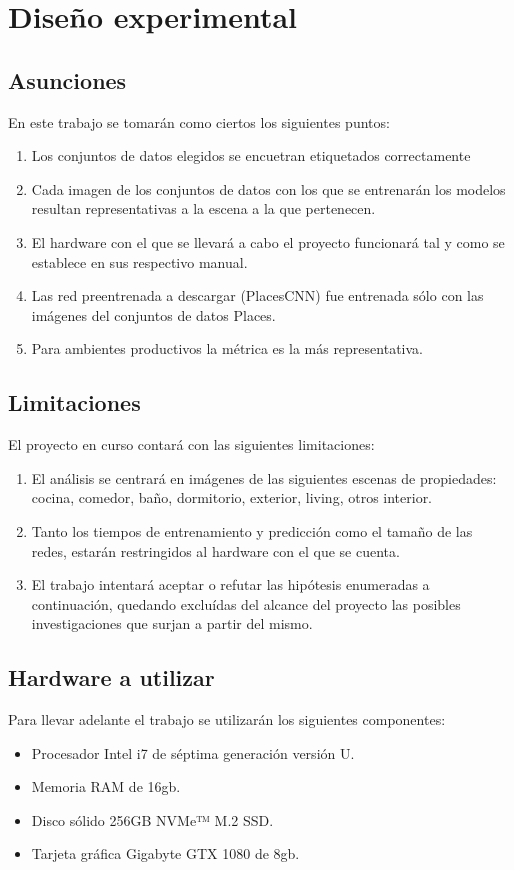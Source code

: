 \section{Diseño experimental}
\subsection{Asunciones}
En este trabajo se tomarán como ciertos los siguientes puntos:
\begin{enumerate}
	\item Los conjuntos de datos elegidos se encuetran etiquetados correctamente 
	\item Cada imagen de los conjuntos de datos con los que se entrenarán los modelos resultan representativas a la escena a la que pertenecen.
	\item El hardware con el que se llevará a cabo el proyecto funcionará tal y como se establece en sus respectivo manual.
	\item Las red preentrenada a descargar (PlacesCNN) fue entrenada sólo con las imágenes del conjuntos de datos Places.
	\item Para ambientes productivos la métrica \cite{balanced_accuracy_score} es la más representativa.
\end{enumerate}

\subsection{Limitaciones} \label{ssec:limitaciones}
El proyecto en curso contará con las siguientes limitaciones:
\begin{enumerate}
	\item El análisis se centrará en imágenes de las siguientes escenas de propiedades: cocina, comedor, baño, dormitorio, exterior, living, otros interior.
	\item Tanto los tiempos de entrenamiento y predicción como el tamaño de las redes, estarán restringidos al hardware con el que se cuenta.
	\item El trabajo intentará aceptar o refutar las hipótesis enumeradas a continuación, quedando excluídas del alcance del proyecto las posibles investigaciones que surjan a partir del mismo.
\end{enumerate}

\subsection{Hardware a utilizar} \label{ssec:hardware}
Para llevar adelante el trabajo se utilizarán los siguientes componentes:
\begin{itemize}
	\item Procesador Intel i7 de séptima generación versión U.
	\item Memoria RAM de 16gb.
	\item Disco sólido 256GB NVMe™ M.2 SSD.
	\item Tarjeta gráfica Gigabyte GTX 1080 de 8gb.
\end{itemize}

